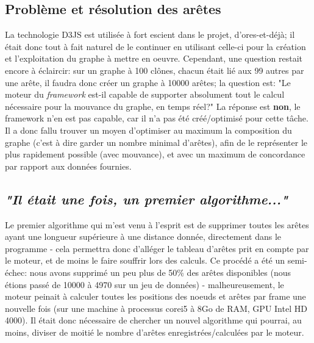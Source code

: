 \documentclass[12pt]{report}
\begin{document}
\begin{spacing}{1.2}
\section{Problème et résolution des arêtes}
La technologie D3JS est utilisée à fort escient dans le projet, d'ores-et-déjà; il était donc tout à fait naturel de le continuer en utilisant celle-ci pour la création et l'exploitation du graphe à mettre en oeuvre.
\newline
Cependant, une question restait encore à éclaircir: sur un graphe à 100 clônes, chacun était lié aux 99 autres par une arête, il faudra donc créer un graphe à 10000 arêtes; la question est: "Le moteur du \textit{framework} est-il capable de supporter absolument tout le calcul nécessaire pour la mouvance du graphe, en temps réel?"
\newline
La réponse est \textbf{non}, le framework n'en est pas capable, car il n'a pas été créé/optimisé pour cette tâche.
\newline
Il a donc fallu trouver un moyen d'optimiser au maximum la composition du graphe (c'est à dire garder un nombre minimal d'arêtes), afin de le représenter le plus rapidement possible (avec mouvance), et avec un maximum de concordance par rapport aux données fournies.

\subsection{\textit{"Il était une fois, un premier algorithme..."}}
Le premier algorithme qui m'est venu à l'esprit est de supprimer toutes les arêtes ayant une longueur supérieure à une distance donnée, directement dans le programme - cela permettra donc d'alléger le tableau d'arêtes prit en compte par le moteur, et de moins le faire souffrir lors des calculs.
\newline
Ce procédé a été un semi-échec: nous avons supprimé un peu plus de 50\% des arêtes disponibles (nous étions passé de 10000 à 4970 sur un jeu de données) - malheureusement, le moteur peinait à calculer toutes les positions des noeuds et arêtes par frame une nouvelle fois (sur une machine à processus corei5 à 8Go de RAM, GPU Intel HD 4000).
\newline
Il était donc nécessaire de chercher un nouvel algorithme qui pourrai, au moins, diviser de moitié le nombre d'arêtes enregistrées/calculées par le moteur.


\end{spacing}
\end{document}
